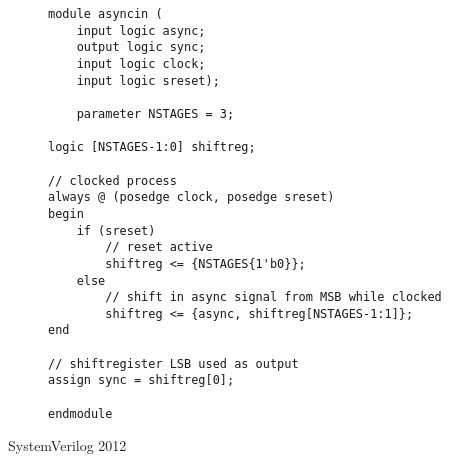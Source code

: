 \begin{center}
    \begin{figure}[h]
        \begin{verbatim}
module asyncin (
    input logic async;
    output logic sync;
    input logic clock;
    input logic sreset);

    parameter NSTAGES = 3;

logic [NSTAGES-1:0] shiftreg;

// clocked process
always @ (posedge clock, posedge sreset)
begin
    if (sreset)
        // reset active
        shiftreg <= {NSTAGES{1'b0}};
    else
        // shift in async signal from MSB while clocked
        shiftreg <= {async, shiftreg[NSTAGES-1:1]};
end

// shiftregister LSB used as output
assign sync = shiftreg[0];

endmodule
        \end{verbatim}
    \end{figure}
    SystemVerilog 2012
\end{center}
